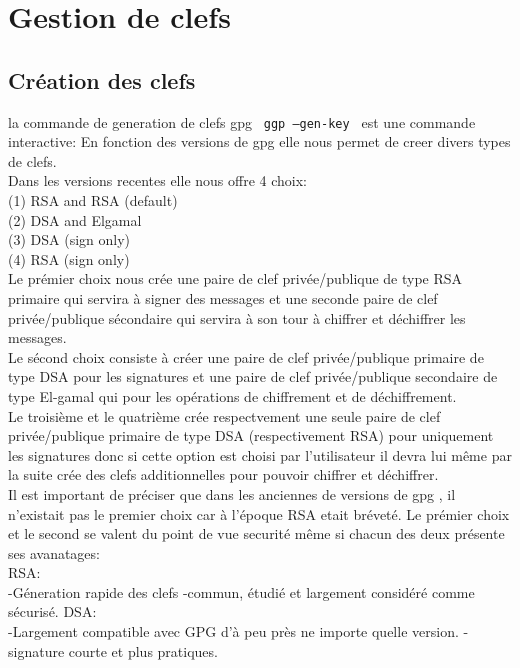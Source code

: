 
\section{Gestion de clefs}
\subsection{Création des clefs}



la commande de generation de clefs gpg  \texttt{ ggp --gen-key } est une commande interactive:
En fonction des versions de gpg elle nous permet de creer divers types de clefs.\\
Dans les versions recentes elle nous offre 4 choix:\\
   (1) RSA and RSA (default)\\
   (2) DSA and Elgamal\\
   (3) DSA (sign only)\\
   (4) RSA (sign only)\\
   
Le prémier choix nous crée une paire de clef privée/publique de type RSA primaire qui servira à signer des messages et une seconde 
paire de clef privée/publique sécondaire qui servira à son tour à chiffrer et déchiffrer les messages.\\
Le sécond choix consiste à créer une paire de clef privée/publique primaire de type DSA pour les signatures et une paire de clef 
privée/publique secondaire de type El-gamal qui pour les opérations de chiffrement et de déchiffrement.\\
Le troisième et le quatrième crée respectvement une seule paire de clef privée/publique primaire de type DSA (respectivement RSA) pour
uniquement les signatures donc si cette option est choisi par l'utilisateur il devra lui même par la suite crée des clefs additionnelles 
pour pouvoir chiffrer et déchiffrer.\\

Il est important de préciser que dans les anciennes de versions de gpg , il n'existait pas le premier choix car à l'époque RSA
etait bréveté.
Le prémier choix et le second se valent du point de vue securité même si chacun des deux présente ses avanatages:\\
RSA:\\ 
-Géneration rapide des clefs
-commun, étudié et largement considéré comme sécurisé. 
DSA:\\
-Largement compatible avec GPG d'à peu près ne importe quelle version. 
-signature courte et plus pratiques.

